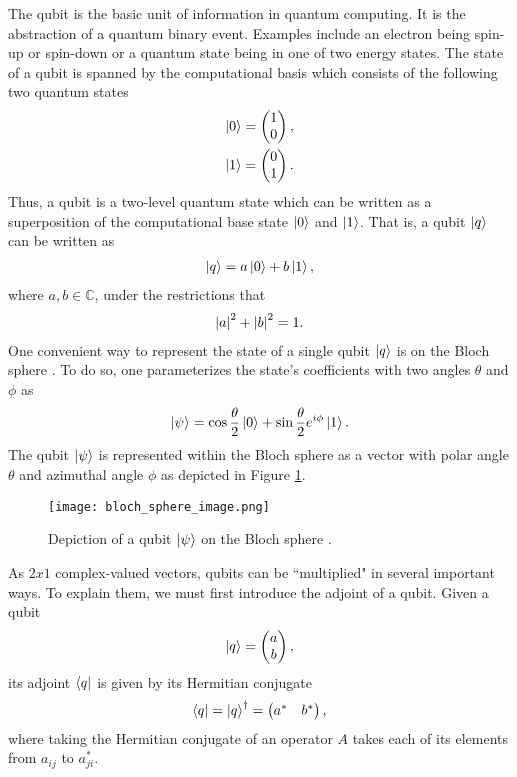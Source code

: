 \documentclass[10pt]{article}
\begin{document}
The qubit is the basic unit of information in quantum computing. It is the abstraction of a quantum binary event. Examples include an electron being spin-up or spin-down or a quantum state being in one of two energy states. The state of a qubit is spanned by the computational basis which consists of the following two quantum states
\begin{align}
\ket{0}
&=
\begin{pmatrix}
1 \\ 0
\end{pmatrix},
\\
\ket{1}
&=
\begin{pmatrix}
0 \\ 1
\end{pmatrix}.
\end{align}
Thus, a qubit is a two-level quantum state which can be written as a superposition of the computational base state $\ket{0}$ and $\ket{1}$. That is, a qubit $\ket{q}$ can be written as
\begin{align}
\ket{q}=a\ket{0}+b\ket{1},
\end{align}
where $a,b\in\mathbb{C}$, under the restrictions that
\begin{align}
\abs{a}^2+\abs{b}^2=1.
\end{align}
One convenient way to represent the state of a single qubit $\ket{q}$ is on the Bloch sphere \cite{ref:bloch_sphere}. To do so, one parameterizes the state's coefficients with two angles $\theta$ and $\phi$ as
\begin{align}
\ket{\psi}=\cos\frac{\theta}{2}\ket{0}+\sin\frac{\theta}{2}e^{i\phi}\ket{1}
.\end{align}
The qubit $\ket{\psi}$ is represented within the Bloch sphere as a vector with polar angle $\theta$ and azimuthal angle $\phi$ as depicted in Figure \ref{fig:bloch_sphere}.

\begin{figure}
    \centering
    \texttt{[image: bloch\_sphere\_image.png]}   
    \caption{Depiction of a qubit $\ket{\psi}$ on the Bloch sphere \cite{ref:bloch_pic}.}
    \label{fig:bloch_sphere}
\end{figure}

As $2x1$ complex-valued vectors, qubits can be ``multiplied" in several important ways. To explain them, we must first introduce the adjoint of a qubit. Given a qubit
\begin{align}
\ket{q}
=
\begin{pmatrix}
a \\ b
\end{pmatrix}
,\end{align}
its adjoint $\bra{q}$ is given by its Hermitian  conjugate 
\begin{align}
\bra{q}
=
\ket{q}^\dagger
=
\begin{pmatrix}
a^* & b^*
\end{pmatrix}
,\end{align}
where taking the Hermitian conjugate of an operator $A$ takes each of its elements from $a_{ij}$ to $a^*_{ji}$.
\end{document}
